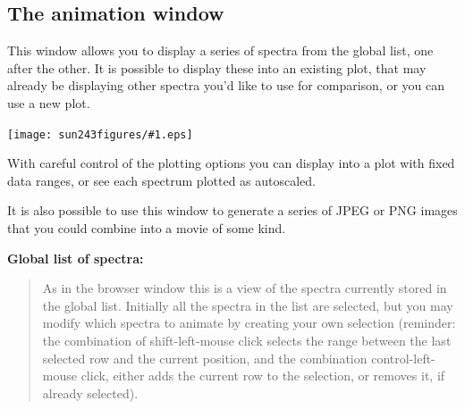 \documentclass[twoside,11pt]{article}
\newcommand{\htmladdimg}[1]{}
\newcommand{\latexhtml}[2]{#1}
\newcommand{\xlabel}[1]{}
\renewcommand{\_}{\texttt{\symbol{95}}}
\newcommand{\mainfigure}[1]
{\begin{center}
 \latexhtml{\texttt{[image: sun243\_figures/\#1.eps]}}{\htmladdimg{#1.gif}}
 \end{center}
}
\newcommand{\subheading}[1]{\textbf{\large{#1}}}
\begin{document}
\newpage
\subsection{The animation window\xlabel{animation_window}}

This window allows you to display a series of spectra from the global list,
one after the other. It is possible to display these into an existing plot,
that may already be displaying other spectra you'd like to use for comparison,
or you can use a new plot.

\mainfigure{animationwindow}

With careful control of the plotting options you can display into a
plot with fixed data ranges, or see each spectrum plotted as
autoscaled.

It is also possible to use this window to generate a series of JPEG or PNG
images that you could combine into a movie of some kind.

\subheading{Global list of spectra:}
\begin{quote}
 As in the browser window this is a view of the spectra currently
 stored in the global list. Initially all the spectra in the list are
 selected, but you may modify which spectra to animate by creating your
 own selection (reminder: the combination of shift-left-mouse click
 selects the range between the last selected row and the current
 position, and the combination control-left-mouse click, either adds
 the current row to the selection, or removes it, if already selected).
\end{quote}
\end{document}
